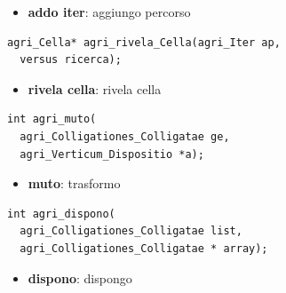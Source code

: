 \documentclass[8pt]{book}
\begin{document}
\begin{itemize}
\item
  \textbf{addo iter}: aggiungo percorso
\end{itemize}

\begin{spacing}{0.9}
  \begin{small}
    \begin{tcolorbox}
\begin{verbatim}
agri_Cella* agri_rivela_Cella(agri_Iter ap,
  versus ricerca);
\end{verbatim}
  \end{tcolorbox}
    \end{small}
      \end{spacing}

\begin{itemize}

\item
  \textbf{rivela cella}: rivela cella
\end{itemize}

\begin{spacing}{0.9}
  \begin{small}
    \begin{tcolorbox}
\begin{verbatim}
int agri_muto(
  agri_Colligationes_Colligatae ge,
  agri_Verticum_Dispositio *a);
\end{verbatim}
  \end{tcolorbox}
    \end{small}
      \end{spacing}

\begin{itemize}
\item
  \textbf{muto}: trasformo
\end{itemize}

\begin{spacing}{0.9}
  \begin{small}
    \begin{tcolorbox}
\begin{verbatim}
int agri_dispono(
  agri_Colligationes_Colligatae list,
  agri_Colligationes_Colligatae * array);
\end{verbatim}
  \end{tcolorbox}
    \end{small}
      \end{spacing}

\begin{itemize}
\item
  \textbf{dispono}: dispongo
\end{itemize}
\end{document}

